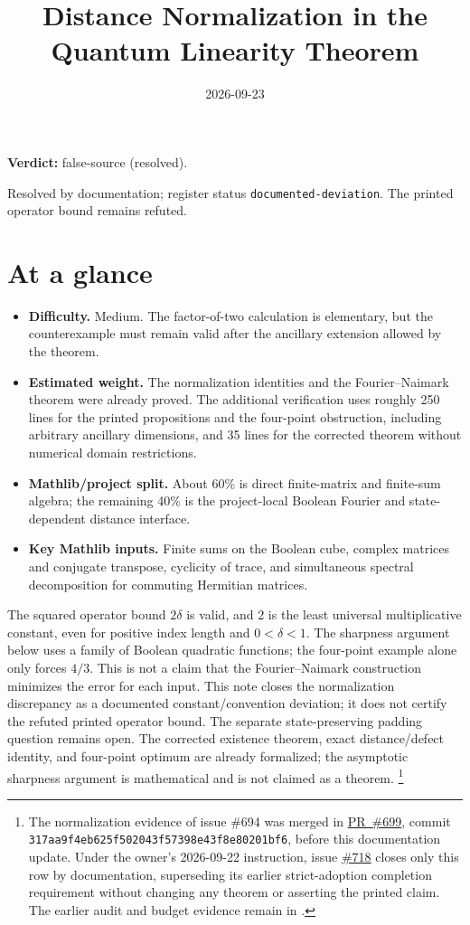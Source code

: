\documentclass[11pt]{article}
\title{Distance Normalization in the Quantum Linearity Theorem}
\author{}
\date{2026-09-23}
\providecommand{\gapnote}[2]{\par\noindent\textbf{Verdict:} #1 (#2).\par}
\begin{document}
\maketitle
\gapnote{false-source}{resolved}
\noindent Resolved by documentation; register status
\texttt{documented-deviation}. The printed operator bound remains refuted.

\section{At a glance}

\begin{itemize}
  \item \textbf{Difficulty.} Medium.  The factor-of-two calculation is
  elementary, but the counterexample must remain valid after the ancillary
  extension allowed by the theorem.
  \item \textbf{Estimated weight.} The normalization identities and the
  Fourier--Naimark theorem were already proved. The additional verification
  uses roughly 250 lines for the printed propositions and the four-point
  obstruction, including arbitrary ancillary dimensions, and 35 lines for
  the corrected theorem without numerical domain restrictions.
  \item \textbf{Mathlib/project split.} About 60\% is direct finite-matrix and
  finite-sum algebra; the remaining 40\% is the project-local Boolean Fourier
  and state-dependent distance interface.
  \item \textbf{Key Mathlib inputs.} Finite sums on the Boolean cube, complex
  matrices and conjugate transpose, cyclicity of trace, and simultaneous
  spectral decomposition for commuting Hermitian matrices.
\end{itemize}
The squared operator bound $2\delta$ is valid, and $2$ is the least universal
multiplicative constant, even for positive index length and $0<\delta<1$.
The sharpness argument below uses a family of Boolean quadratic functions;
the four-point example alone only forces $4/3$. This is not a claim that the
Fourier--Naimark construction minimizes the error for each input. This note
closes the normalization discrepancy as a documented constant/convention
deviation; it does not certify the refuted printed operator bound. The
separate state-preserving padding question remains open. The corrected
existence theorem, exact distance/defect identity, and four-point optimum
are already formalized; the asymptotic sharpness argument is mathematical
and is not claimed as a \Lean{} theorem.%
\footnote{The normalization evidence of issue \#694 was merged in
\href{https://github.com/Dengnifer/MIPStarRE-QPBT/pull/699}{PR~\#699},
commit \texttt{317aa9f4eb625f502043f57398e43f8e80201bf6}, before this
documentation update. Under the owner's 2026-09-22 instruction, issue
\href{https://github.com/Dengnifer/MIPStarRE-QPBT/issues/718}{\#718}
closes only this row by documentation, superseding its earlier strict-adoption
completion requirement without changing any theorem or asserting the printed
claim. The earlier audit and budget evidence remain in
.}
\end{document}

